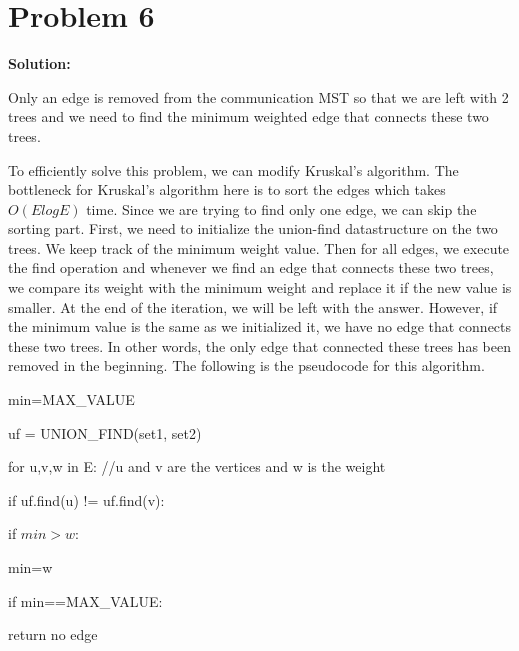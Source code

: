 \documentclass{article}
\begin{document}
\section*{Problem 6}
\textbf{Solution:}

Only an edge is removed from the communication MST so that we are left with 2 trees and we need to find the minimum weighted edge that connects these two trees.

To efficiently solve this problem, we can modify Kruskal's algorithm. The bottleneck for Kruskal's algorithm here is to sort the edges which takes $O(ElogE)$ time. Since we are trying to find only one edge, we can skip the sorting part. First, we need to initialize the union-find datastructure on the two trees. We keep track of the minimum weight value. Then for all edges, we execute the find operation and whenever we find an edge that connects these two trees, we compare its weight with the minimum weight and replace it if the new value is smaller. At the end of the iteration, we will be left with the answer. However, if the minimum value is the same as we initialized it, we have no edge that connects these two trees. In other words, the only edge that connected these trees has been removed in the beginning. The following is the pseudocode for this algorithm.

\hspace{5mm} min=MAX\_VALUE

\hspace{5mm} uf = UNION\_FIND(set1, set2)

\hspace{5mm} for u,v,w in E: //u and v are the vertices and w is the weight

\hspace{5mm} \hspace{5mm} if uf.find(u) != uf.find(v):

\hspace{5mm} \hspace{5mm} \hspace{5mm} if $min>w$:

\hspace{5mm} \hspace{5mm} \hspace{5mm} \hspace{5mm} min=w

\hspace{5mm} if min==MAX\_VALUE:

\hspace{5mm} \hspace{5mm} return no edge
\end{document}
